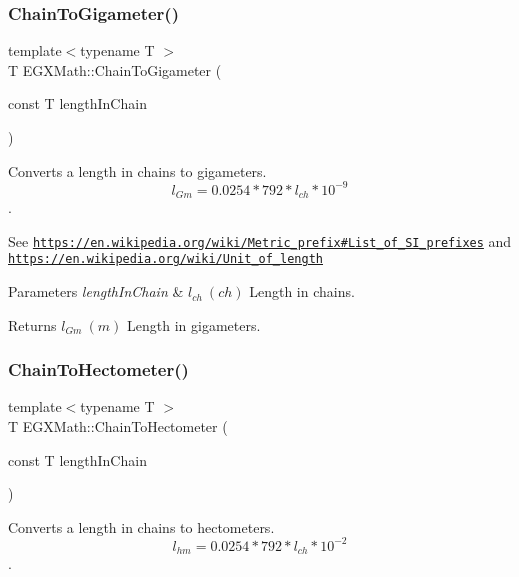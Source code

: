 \subsubsection{\texorpdfstring{Chain\+To\+Gigameter()}{ChainToGigameter()}}
{\footnotesize\ttfamily template$<$typename T $>$ \\
T E\+G\+X\+Math\+::\+Chain\+To\+Gigameter (\begin{DoxyParamCaption}\item[{const T}]{length\+In\+Chain }\end{DoxyParamCaption})}



Converts a length in chains to gigameters. \[ l_{Gm}=0.0254 * 792 * l_{ch} * 10^{-9} \]. 

See \href{https://en.wikipedia.org/wiki/Metric_prefix#List_of_SI_prefixes}{\tt https\+://en.\+wikipedia.\+org/wiki/\+Metric\+\_\+prefix\#\+List\+\_\+of\+\_\+\+S\+I\+\_\+prefixes} and \href{https://en.wikipedia.org/wiki/Unit_of_length}{\tt https\+://en.\+wikipedia.\+org/wiki/\+Unit\+\_\+of\+\_\+length} 
\begin{DoxyParams}{Parameters}
{\em length\+In\+Chain} & $ l_{ch}\ (ch)$ Length in chains. \\
\hline
\end{DoxyParams}
\begin{DoxyReturn}{Returns}
$ l_{Gm}\ (m)$ Length in gigameters. 
\end{DoxyReturn}
\mbox{\label{group___e_g_x_math-_conversions-_length_conversions-_surveyors-_chain-_s_i_ga306a29ba8425ed22c19171e718d42f20}} 
\subsubsection{\texorpdfstring{Chain\+To\+Hectometer()}{ChainToHectometer()}}
{\footnotesize\ttfamily template$<$typename T $>$ \\
T E\+G\+X\+Math\+::\+Chain\+To\+Hectometer (\begin{DoxyParamCaption}\item[{const T}]{length\+In\+Chain }\end{DoxyParamCaption})}



Converts a length in chains to hectometers. \[ l_{hm}=0.0254 * 792 * l_{ch} * 10^{-2} \]. 

